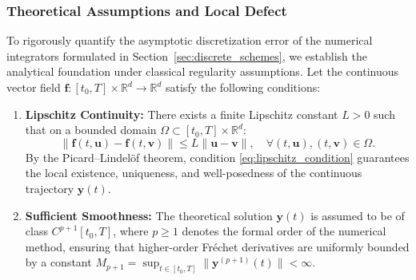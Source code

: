 \documentclass[11pt,a4paper]{article}
\theoremstyle{definition}
\theoremstyle{remark}
\begin{document}
\label{sec:consistency_and_truncation_error}

\subsubsection{Theoretical Assumptions and Local Defect}
To rigorously quantify the asymptotic discretization error of the numerical integrators formulated in Section~\ref{sec:discrete_schemes}, we establish the analytical foundation under classical regularity assumptions. Let the continuous vector field $\mathbf{f}: [t_0, T] \times \mathbb{R}^d \to \mathbb{R}^d$ satisfy the following conditions:
\begin{enumerate}
    \item \textbf{Lipschitz Continuity:} There exists a finite Lipschitz constant $L > 0$ such that on a bounded domain $\Omega \subset [t_0, T] \times \mathbb{R}^d$:
    \begin{equation}
    \label{eq:lipschitz_condition}
    \|\mathbf{f}(t, \mathbf{u}) - \mathbf{f}(t, \mathbf{v})\| \le L \|\mathbf{u} - \mathbf{v}\|, \quad \forall (t, \mathbf{u}), (t, \mathbf{v}) \in \Omega.
    \end{equation}
    By the Picard--Lindel\"of theorem, condition \eqref{eq:lipschitz_condition} guarantees the local existence, uniqueness, and well-posedness of the continuous trajectory $\mathbf{y}(t)$.
    \item \textbf{Sufficient Smoothness:} The theoretical solution $\mathbf{y}(t)$ is assumed to be of class $C^{p+1}[t_0, T]$, where $p \ge 1$ denotes the formal order of the numerical method, ensuring that higher-order Fr\'echet derivatives are uniformly bounded by a constant $M_{p+1} = \sup_{t \in [t_0, T]} \|\mathbf{y}^{(p+1)}(t)\| < \infty$.
\end{enumerate}
\end{document}
